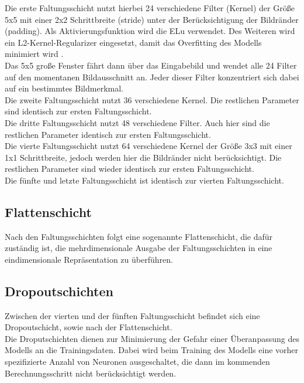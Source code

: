 Die erste Faltungsschicht nutzt hierbei 24 verschiedene Filter (Kernel) der Größe 5x5 mit einer 2x2 Schrittbreite (stride) unter der Berücksichtigung der Bildränder (padding). Als Aktivierungsfunktion wird die ELu verwendet. Des Weiteren wird ein L2-Kernel-Regularizer eingesetzt, damit das Overfitting des Modells minimiert wird \cite{tensorflow2}.  \\ 
Das 5x5 große Fenster fährt dann über das Eingabebild und wendet alle 24 Filter auf den momentanen Bildausschnitt an. Jeder dieser Filter konzentriert sich dabei auf ein bestimmtes Bildmerkmal. \\

Die zweite Faltungsschicht nutzt 36 verschiedene Kernel. Die restlichen Parameter sind identisch zur ersten Faltungsschicht. \\

Die dritte Faltungsschicht nutzt 48 verschiedene Filter. Auch hier sind die restlichen Parameter identisch zur ersten Faltungsschicht. \\

Die vierte Faltungsschicht nutzt 64 verschiedene Kernel der Größe 3x3 mit einer 1x1 Schrittbreite, jedoch werden hier die Bildränder nicht berücksichtigt. Die restlichen Parameter sind wieder identisch zur ersten Faltungsschicht. \\

Die fünfte und letzte Faltungsschicht ist identisch zur vierten Faltungsschicht.

\subsection{Flattenschicht}

Nach den Faltungsschichten folgt eine sogenannte Flattenschicht, die dafür zuständig ist, die mehrdimensionale Ausgabe der Faltungsschichten  in eine eindimensionale Repräsentation zu überführen. \cite{hhu}

\subsection{Dropoutschichten}

Zwischen der vierten und der fünften Faltungsschicht befindet sich eine Dropoutschicht, sowie nach der Flattenschicht. \\ Die Droputschichten dienen zur Minimierung der Gefahr einer Überanpassung des Modells an die Trainingsdaten. Dabei wird beim Training des Modells eine vorher spezifizierte Anzahl von Neuronen ausgeschaltet, die dann im kommenden Berechnungsschritt nicht berücksichtigt werden. \cite{wiki2}

